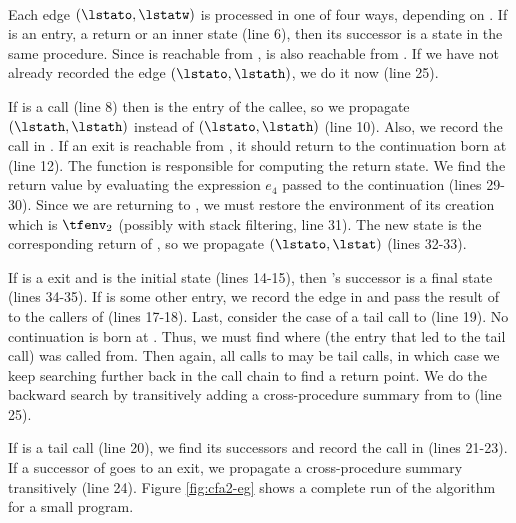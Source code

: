 \documentclass{LMCS}
\theoremstyle{definition} \newtheorem{property}[thm]{Property}
\begin{document}
\paragraph{}
Each edge $(\lstato, \lstatw)$ is processed in one of four ways, depending on 
\lstatw.
If \lstatw{} is an entry, a return or an inner state (line 6), 
then its successor \lstath{} is a state in the same procedure.
Since \lstatw{} is reachable from \lstato, 
\lstath{} is also reachable from \lstato.
If we have not already recorded the edge $(\lstato, \lstath)$, we do it now 
(line 25).

If \lstatw{} is a call (line 8) then \lstath{} is the entry of the callee,
so we propagate $(\lstath, \lstath)$ instead of $(\lstato, \lstath)$ (line 10).
Also, we record the call in \callers.
If an exit \lstatf{} is reachable from \lstath, it should return
to the continuation born at \lstatw{} (line 12).
The function  is responsible for computing the return state.
We find the return value \auarg{} by evaluating the expression $e_4$ passed to
the continuation (lines 29-30).
Since we are returning to , we must restore the environment of 
its creation which is $\tfenv_2$ (possibly with stack filtering, line 31).
The new state \lstat{} is the corresponding return of \lstatw{},
so we propagate $(\lstato, \lstat)$ (lines 32-33).

If \lstatw{} is a \dlceval{} exit and \lstato{} is the initial state (lines 
14-15), then \lstatw{}'s successor is a final state (lines 34-35).
If \lstato{} is some other entry, we record the edge in \summary{} and pass the
re\-sult of \lstatw{} to the callers of \lstato{} (lines 17-18).
Last, consider the case of a tail call \lstatf{} to \lstato{} (line 19).
No continuation is born at \lstatf.
Thus, we must find where \lstath{} (the entry that led to the tail call) was 
called from.
Then again, all calls to \lstath{} may be tail calls, in which case we keep 
searching further back in the call chain to find a return point.
We do the backward search by transitively adding a cross-procedure summary from
\lstath{} to \lstatw{} (line 25).

If \lstatw{} is a tail call (line 20), we find its successors and record the 
call in \tcallers{} (lines 21-23).
If a successor of \lstatw{} goes to an exit, we propagate a cross-procedure
summary transitively (line 24).
Figure \ref{fig:cfa2-eg} shows a complete run of the algorithm for a small 
program.
\end{document}
